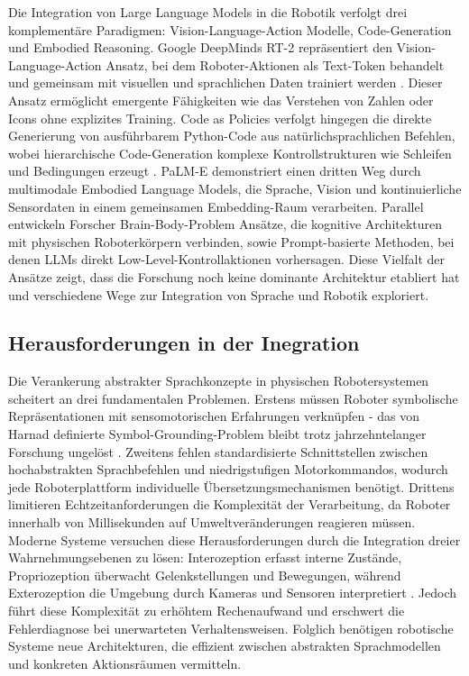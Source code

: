 Die Integration von Large Language Models in die Robotik
verfolgt drei komplementäre Paradigmen: Vision-Language-Action Modelle,
Code-Generation und Embodied Reasoning. Google DeepMinds RT-2 repräsentiert den
Vision-Language-Action Ansatz, bei dem Roboter-Aktionen als Text-Token behandelt
und gemeinsam mit visuellen und sprachlichen Daten trainiert werden . Dieser Ansatz ermöglicht emergente Fähigkeiten wie das Verstehen von
Zahlen oder Icons ohne explizites Training. Code as Policies verfolgt hingegen
die direkte Generierung von ausführbarem Python-Code aus natürlichsprachlichen
Befehlen, wobei hierarchische Code-Generation komplexe Kontrollstrukturen wie
Schleifen und Bedingungen erzeugt . PaLM-E demonstriert
einen dritten Weg durch multimodale Embodied Language Models, die Sprache,
Vision und kontinuierliche Sensordaten in einem gemeinsamen Embedding-Raum
verarbeiten. Parallel entwickeln Forscher Brain-Body-Problem Ansätze, die
kognitive Architekturen mit physischen Roboterkörpern verbinden, sowie
Prompt-basierte Methoden, bei denen LLMs direkt Low-Level-Kontrollaktionen
vorhersagen. Diese Vielfalt der Ansätze zeigt, dass die Forschung noch keine
dominante Architektur etabliert hat und verschiedene Wege zur Integration von
Sprache und Robotik exploriert.

\subsection{Herausforderungen in der Inegration}

Die Verankerung abstrakter Sprachkonzepte in physischen Robotersystemen
scheitert an drei fundamentalen Problemen. Erstens müssen Roboter symbolische
Repräsentationen mit sensomotorischen Erfahrungen verknüpfen - das von Harnad
definierte Symbol-Grounding-Problem bleibt trotz jahrzehntelanger Forschung
ungelöst . Zweitens fehlen
standardisierte Schnittstellen zwischen hochabstrakten Sprachbefehlen und
niedrigstufigen Motorkommandos, wodurch jede Roboterplattform individuelle
Übersetzungsmechanismen benötigt. Drittens limitieren Echtzeitanforderungen die
Komplexität der Verarbeitung, da Roboter innerhalb von Millisekunden auf
Umweltveränderungen reagieren müssen. Moderne Systeme versuchen diese
Herausforderungen durch die Integration dreier Wahrnehmungsebenen zu lösen:
Interozeption erfasst interne Zustände, Propriozeption überwacht
Gelenkstellungen und Bewegungen, während Exterozeption die Umgebung durch
Kameras und Sensoren interpretiert . Jedoch führt diese
Komplexität zu erhöhtem Rechenaufwand und erschwert die Fehlerdiagnose bei
unerwarteten Verhaltensweisen. Folglich benötigen robotische Systeme neue
Architekturen, die effizient zwischen abstrakten Sprachmodellen und konkreten
Aktionsräumen vermitteln.

